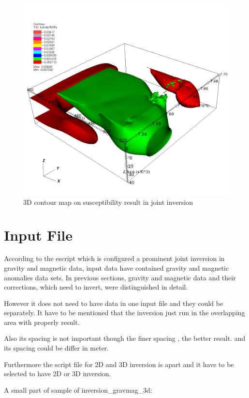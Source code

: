 \begin{figure}
\centering
\includegraphics[width=\textwidth]{jointsus2.png}
\caption{3D contour map on susceptibility result in joint inversion}
\label{fig:jointsus2}
\end{figure}


\section{Input File} 

According to the escript which is configured a prominent joint inversion in gravity and magnetic data, input data have contained gravity and magnetic anomalies data sets. In previous sections, gravity and magnetic data and their corrections, which need to invert, were distinguished in detail.

However it does not need to have data in one input file and they could be separately. It have to be mentioned that the inversion just run in the overlapping area with properly result.

Also its spacing is not important though the finer spacing , the better result. and its spacing could be differ in meter. 

Furthermore the script file for 2D and 3D inversion is apart and it have to be selected to have 2D or 3D inversion.

A small part of sample of inversion_gravmag_3d:

